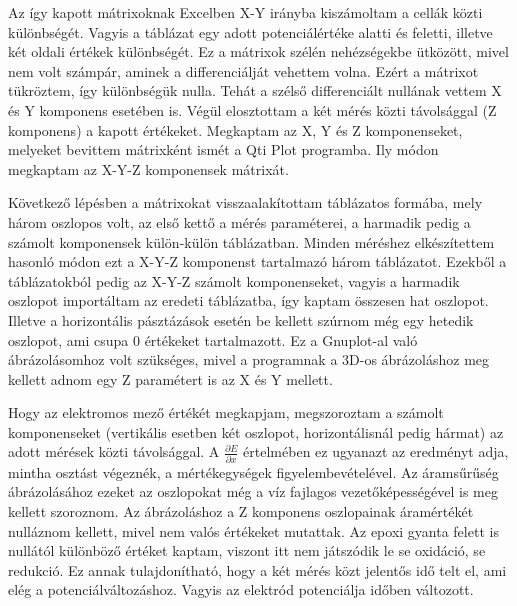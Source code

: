 Az így kapott mátrixoknak Excelben X-Y irányba kiszámoltam a cellák közti különbségét. Vagyis a táblázat egy adott potenciálértéke alatti és feletti, illetve két oldali értékek különbségét. Ez a mátrixok szélén nehézségekbe ütközött, mivel nem volt számpár, aminek a differenciálját vehettem volna. Ezért a mátrixot tükröztem, így különbségük nulla. Tehát a szélső differenciált nullának vettem X és Y komponens esetében is. Végül elosztottam a két mérés közti távolsággal (Z komponens) a kapott értékeket. Megkaptam az X, Y és Z komponenseket, melyeket bevittem mátrixként ismét a Qti Plot programba. Ily módon megkaptam az X-Y-Z komponensek mátrixát.

Következő lépésben a mátrixokat visszaalakítottam táblázatos formába, mely három oszlopos volt, az első kettő a mérés paraméterei, a harmadik pedig a számolt komponensek külön-külön táblázatban. Minden méréshez elkészítettem hasonló módon ezt a X-Y-Z komponenst tartalmazó három táblázatot. Ezekből a táblázatokból pedig az X-Y-Z számolt komponenseket, vagyis a harmadik oszlopot importáltam az eredeti táblázatba, így kaptam összesen hat oszlopot. Illetve a horizontális pásztázások esetén be kellett szúrnom még egy hetedik oszlopot, ami csupa 0 értékeket tartalmazott. Ez a Gnuplot-al való ábrázolásomhoz volt szükséges, mivel a programnak a 3D-os ábrázoláshoz meg kellett adnom egy Z paramétert is az X és Y mellett. 

Hogy az elektromos mező értékét megkapjam, megszoroztam a számolt komponenseket (vertikális esetben két oszlopot, horizontálisnál pedig hármat) az adott mérések közti távolsággal. A $\frac{\partial E}{\partial x}$ értelmében ez ugyanazt az eredményt adja, mintha osztást végeznék, a mértékegységek figyelembevételével. Az áramsűrűség ábrázolásához ezeket az oszlopokat még a víz fajlagos vezetőképességével is meg kellett szoroznom. Az ábrázoláshoz a Z komponens oszlopainak áramértékét nulláznom kellett, mivel nem valós értékeket mutattak. Az epoxi gyanta felett is nullától különböző értéket kaptam, viszont itt nem játszódik le se oxidáció, se redukció. Ez annak tulajdonítható, hogy a két mérés közt jelentős idő telt el, ami elég a potenciálváltozáshoz. Vagyis az elektród potenciálja időben változott.
